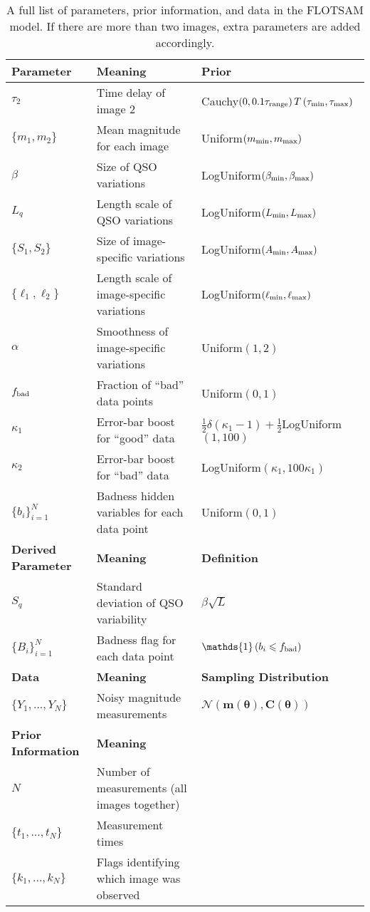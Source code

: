 \documentclass[useAMS,usenatbib, a4paper]{mn2e} \usepackage{natbib}
\newcommand{\params}{\boldsymbol{\theta}}
\begin{document}
\begin{table*}
\begin{tabular}{lll}
\hline
{\bf Parameter} &	{\bf Meaning}			& {\bf Prior}\\
\hline
$\tau_2$	&	Time delay of image 2	&	Cauchy$\left(0, 0.1\tau_{\rm range}\right)T\left(\tau_{\rm min},\tau_{\rm max}\right)$\\
$\{m_1, m_2\}$	&	Mean magnitude for each image	& Uniform$(m_{\rm min}, m_{\rm max})$\\
$\beta$		&	Size of QSO variations		& LogUniform$(\beta_{\rm min}, \beta_{\rm max})$\\
$L_q$		&	Length scale of QSO variations	& LogUniform$(L_{\rm min}, L_{\rm max})$\\
$\{S_1, S_2\}$	&	Size of image-specific variations	& LogUniform$\left(A_{\rm min}, A_{\rm max}\right)$\\
$\{\ell_1, \ell_2\}$ &	Length scale of image-specific variations & LogUniform$(\ell_{\rm min}, \ell_{\rm max})$\\
$\alpha$	&	Smoothness of image-specific variations	& Uniform$(1, 2)$\\
$f_{\rm bad}$	&	Fraction of ``bad'' data points	& Uniform$(0,1)$\\
$\kappa_1$	&	Error-bar boost for ``good'' data & $\frac{1}{2}\delta(\kappa_1 - 1) + \frac{1}{2}$LogUniform$(1,100)$\\
$\kappa_2$	&	Error-bar boost for ``bad'' data & LogUniform$(\kappa_1, 100\kappa_1)$\\
$\{b_i\}_{i=1}^N$ &	Badness hidden variables for each data point & Uniform$(0,1)$\\
\hline
{\bf Derived Parameter} & {\bf Meaning}	&	{\bf Definition}\\
\hline
$S_{q}$	&	Standard deviation of QSO variability	& $\beta\sqrt{L}$\\
$\{B_i\}_{i=1}^N$	&	Badness flag for each data point & $\mathds{1}\left(b_i \leq f_{\rm bad}\right)$\\
\hline
{\bf Data}	&	{\bf Meaning}			& {\bf Sampling Distribution}\\
\hline
$\{Y_1, ..., Y_N\}$ &	Noisy magnitude measurements	& $\mathcal{N}\left(\mathbf{m}(\params), \mathbf{C}(\params)\right)$\\
\hline
{\bf Prior Information} & {\bf Meaning}			&\\
\hline
$N$		&	Number of measurements (all images together)\\
$\{t_1, ..., t_N\}$ &	Measurement times\\
$\{k_1, ..., k_N\}$ &	Flags identifying which image was observed
\end{tabular}
\caption{A full list of parameters, prior information, and data in the
FLOTSAM model. If there are more than two images, extra parameters are
added accordingly.\label{tab:prior}}
\end{table*}
\end{document}
